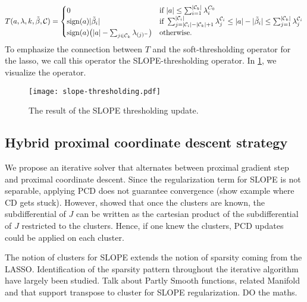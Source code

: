 \begin{equation}
  \label{eq:slope-thresholding}
  T(a, \lambda,k,\tilde \beta, \mathcal{C}) =
  \begin{cases}
    0                                                                 & \text{if } |a| \leq \sum_{i=1}^{|\mathcal{C}_k|}\lambda^{C_0}_i                                                                                                                               \\
    \operatorname{sign}(a)|\tilde \beta_i|                                          & \text{if } \sum_{j= |\mathcal{C}_i| - |\mathcal{C}_k| + 1}^{|\mathcal{C}_i|} \lambda^{\mathcal{C}_i}_j \leq |a| - |\tilde \beta_i| \leq \sum_{j=1}^{|\mathcal{C}_k|}\lambda^{\mathcal{C}_i}_j \\
    \operatorname{sign}(a)\big(|a| - \sum_{j \in \mathcal{C}_k}\lambda_{(j)^-}\big) & \text{otherwise.
    }
  \end{cases}
\end{equation}
To emphasize the connection between \(T\) and the soft-thresholding operator
for the lasso, we call this operator the SLOPE-thresholding operator.
In \cref{fig:slope-thresholding}, we visualize the operator.

\begin{figure}[htbp]
  \centering
  \texttt{[image: slope-thresholding.pdf]}
  \caption{The result of the SLOPE thresholding update.}
  \label{fig:slope-thresholding}
\end{figure}

\subsection{Hybrid proximal coordinate descent strategy}

We propose an iterative solver that alternates between proximal gradient step and proximal coordinate descent.
Since the regularization term for SLOPE is not separable, applying PCD does not guarantee convergence (show example where CD gets stuck).
However, \cite{dupuis2021} showed that once the clusters are known, the subdifferential of $J$ can be written as the cartesian product of the subdifferential of $J$ restricted to the clusters. 
Hence, if one knew the clusters, PCD updates could be applied on each cluster. 

The notion of clusters for SLOPE extends the notion of sparsity coming from the LASSO. 
Identification of the sparsity pattern throughout the iterative algorithm have largely been studied. 
Talk about Partly Smooth functions, related Manifold and that support transpose to cluster for SLOPE regularization. DO the maths. 

